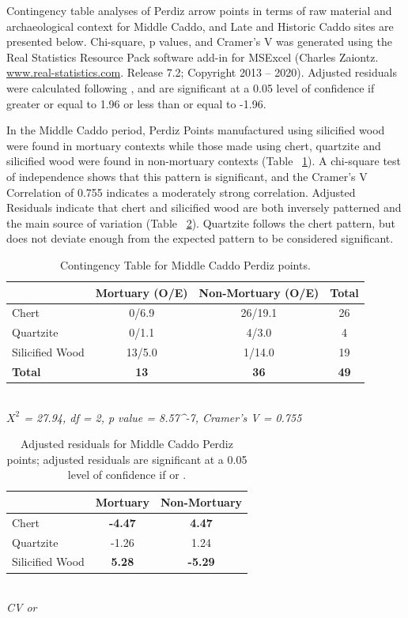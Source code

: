 \documentclass[review]{elsarticle}
\begin{document}
Contingency table analyses of Perdiz arrow points in terms of raw material and archaeological context for Middle Caddo, and Late and Historic Caddo sites are presented below. Chi-square, p values, and Cramer’s V was generated using the Real Statistics Resource Pack software add-in for MSExcel (Charles Zaiontz. \href{www.real-statistics.com}{www.real-statistics.com}. Release 7.2; Copyright 2013 – 2020). Adjusted residuals were calculated following \citet{RN8987}, and are significant at a 0.05 level of confidence if greater or equal to 1.96 or less than or equal to -1.96. 

In the Middle Caddo period, Perdiz Points manufactured using silicified wood were found in mortuary contexts while those made using chert, quartzite and silicified wood were found in non-mortuary contexts (Table ~\ref{tab:Tbl1}). A chi-square test of independence shows that this pattern is significant, and the Cramer’s V Correlation of 0.755 indicates a moderately strong correlation. Adjusted Residuals indicate that chert and silicified wood are both inversely patterned and the main source of variation (Table ~\ref{tab:Tbl2}). Quartzite follows the chert pattern, but does not deviate enough from the expected pattern to be considered significant.

\begin{table}[tbh]\centering
\footnotesize
\caption{Contingency Table for Middle Caddo Perdiz points.}
\centering
\begin{tabular}{lccc}
\hline
 & Mortuary (O/E) & Non-Mortuary (O/E) & Total\\
\hline
Chert & 0/6.9 & 26/19.1 & 26\\
Quartzite & 0/1.1 & 4/3.0 & 4\\
Silicified Wood & 13/5.0 & 1/14.0 & 19\\
\hline
\textbf{Total} & \textbf{13} & \textbf{36} & \textbf{49}\\
\hline
\end{tabular}\\
\textit{$X^{2}$ = 27.94, df = 2, p value = 8.57^{-7}, Cramer’s V = 0.755}
\label{tab:Tbl1}
\end{table}

\begin{table}[tbh]\centering
\footnotesize
\caption{Adjusted residuals for Middle Caddo Perdiz points; adjusted residuals are significant at a 0.05 level of confidence if \textbf{} or \textbf{}.}
\centering
\begin{tabular}{lcc}
\hline
 & Mortuary & Non-Mortuary\\
\hline
Chert & \textbf{-4.47} & \textbf{4.47}\\
Quartzite & -1.26 & 1.24\\
Silicified Wood & \textbf{5.28} & \textbf{-5.29}\\
\hline
\end{tabular}\\
\textit{CV  or }
\label{tab:Tbl2}
\end{table}
\end{document}
